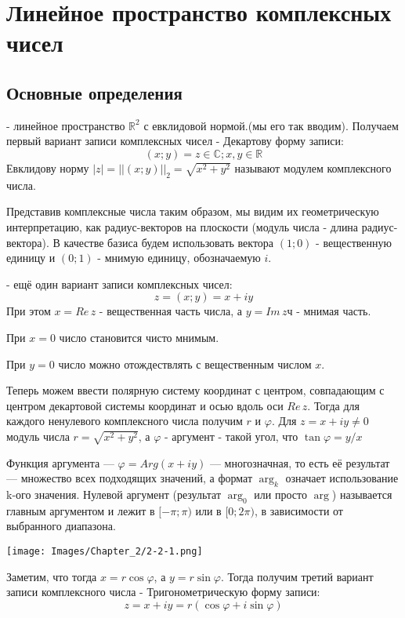 \section{Линейное пространство комплексных чисел}
\subsection{Основные определения}
 - линейное пространство \(\mathbb{R}^2\) с евклидовой нормой.(мы его так вводим).
Получаем первый вариант записи комплексных чисел - Декартову форму записи: $$(x; y)=z\in\mathbb{C}; x, y\in\mathbb{R}$$
Евклидову норму \(|z|=||(x;y)||_2=\sqrt{x^2 + y^2}\) называют модулем комплексного числа.

Представив комплексные числа таким образом, мы видим их геометрическую интерпретацию, как радиус-векторов на плоскости (модуль числа - длина радиус-вектора). В качестве базиса будем использовать вектора \((1;0)\) - вещественную единицу и \((0;1)\) - мнимую единицу, обозначаемую $i$.

 - ещё один вариант записи комплексных чисел:
$$z=(x;y)=x+iy$$
При этом \(x=Re\,z\) - вещественная часть числа, а \(y=Im\,z\)ч - мнимая часть.

При \(x=0\) число становится чисто мнимым.

При \(y=0\) число можно отождествлять с вещественным числом \(x\).

Теперь можем ввести полярную систему координат с центром, совпадающим с центром декартовой системы координат и осью вдоль оси \(Re\,z\). Тогда для каждого ненулевого комплексного числа получим \(r\) и \(\varphi\). Для \(z=x+iy\neq0\) модуль числа \(r=\sqrt{x^2 + y^2}\), а \(\varphi\) - аргумент - такой угол, что \(\tan{\varphi}= y/x\)

Функция аргумента --- \(\varphi=Arg(x+iy)\) --- многозначная, то есть её результат --- множество всех подходящих значений, а формат \(\arg_k\) означает использование k-ого значения. Нулевой аргумент (результат \(\arg_0\) или просто \(\arg\)) называется главным аргументом и лежит в \([-\pi;\pi)\) или в \([0;2\pi)\), в зависимости от выбранного диапазона.
\begin{center}
    \texttt{[image: Images/Chapter\_2/2-2-1.png]}
\end{center}
Заметим, что тогда \(x=r\cos{\varphi}\), а \(y=r\sin{\varphi}\). Тогда получим третий вариант записи комплексного числа - Тригонометрическую форму записи: $$z=x+iy=r(\cos{\varphi}+i\sin{\varphi})$$
\newpage

